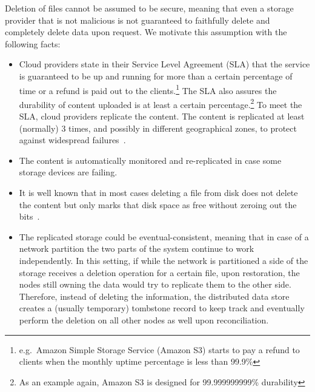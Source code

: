 Deletion of files cannot be assumed to be secure, meaning that even a storage provider that is
not malicious is not guaranteed to faithfully delete and completely delete data upon request.
We motivate this assumption with the following facts:
\begin{itemize}
    \item Cloud providers state in their Service Level Agreement (SLA) that
    the service is guaranteed to be up and running for more than a certain percentage of time or a refund is paid out to the clients.\footnote{e.g.\ Amazon Simple Storage Service (Amazon S3) starts to pay a refund to clients when the monthly uptime percentage is less than 99.9\%}
    The SLA also assures the durability of content uploaded is at least a certain percentage.\footnote{As an example again, Amazon S3 is designed for 99.999999999\% durability}
    To meet the SLA, cloud providers replicate the content. The content is replicated at least (normally) 3 times, and possibly in different geographical zones, to protect against widespread failures~\cite{AzureBlobStorage}.
    \item The content is automatically monitored and re-replicated in case some storage devices are failing.
    \item It is well known that in most cases deleting a file from disk does not delete the content but only marks that disk space as free without zeroing out the bits~\cite{manRM}.
    \item The replicated storage could be eventual-consistent, 
    meaning that in case of a network partition the two 
    parts of the system continue to work independently. 
    In this setting, if while the network is partitioned a side of the storage receives a deletion operation 
    for a certain file, upon restoration,
    the nodes still owning the data would try to replicate 
    them to the other side.
    Therefore, instead of deleting the information, 
    the distributed data store creates a (usually temporary) 
    tombstone record to keep track and eventually perform 
    the deletion on all other nodes as well upon reconciliation.
\end{itemize}

